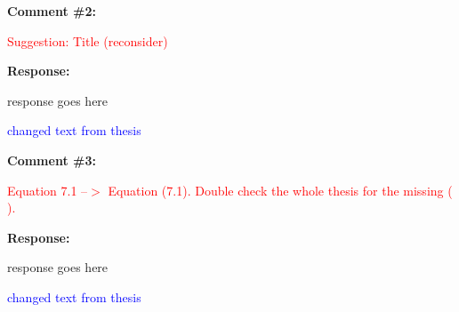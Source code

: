 \documentclass[journal]{IEEEtran}
\begin{document}
\vspace{30pt}
\textbf{Comment \#2:}
\begin{adjustwidth}{2.5em}{0pt}
\singlespacing \vspace{-10pt}
\textcolor{red}{Suggestion: Title (reconsider)}
\end{adjustwidth}

\vspace{10pt}
\textbf{Response:}
\begin{adjustwidth}{2.5em}{0pt}
response goes here

\vspace{10pt}
\noindent\textcolor{blue}{changed text from thesis}
\end{adjustwidth}


\vspace{30pt}
\textbf{Comment \#3:}
\begin{adjustwidth}{2.5em}{0pt}
\singlespacing \vspace{-10pt}
\textcolor{red}{Equation 7.1 --$>$ Equation (7.1). Double check the whole thesis for the missing ( ).}
\end{adjustwidth}

\vspace{10pt}
\textbf{Response:}
\begin{adjustwidth}{2.5em}{0pt}
response goes here

\vspace{10pt}
\noindent\textcolor{blue}{changed text from thesis}
\end{adjustwidth}
\end{document}
